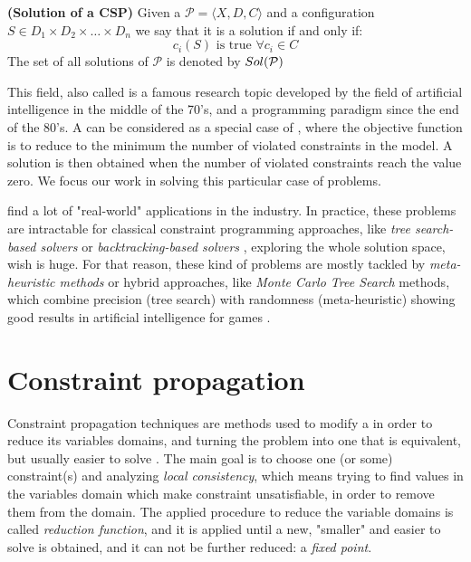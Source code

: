 \begin{definition}{\bf (Solution of a CSP)}
\label{solCSP}
Given a \csp{} $\mathcal{P}=\langle X,D,C \rangle$ and a configuration $S \in D_1\times D_2\times\dots\times D_n$ we say that it is a solution if and only if:	
\begin{equation*}
c_i\left(S\right)\text{ is true }\forall c_i \in C
\end{equation*}
The set of all solutions of $\mathcal{P}$ is denoted by $\mathnormal{Sol}(\mathcal{P})$
\end{definition}

This field, also called \CP{} is a famous research topic developed by the field of artificial intelligence in the middle of the 70's, and a programming paradigm since the end of the 80's. A \csp{} can be considered as a special case of \COPs, where the objective function is to reduce to the minimum the number of violated constraints in the model. A solution is then obtained when the number of violated constraints reach the value zero. We focus our work in solving this particular case of problems.

\csps{} find a lot of "real-world" applications in the industry. In practice, these problems are intractable for classical constraint programming approaches, like \textit{tree search-based solvers} or {\it backtracking-based solvers} \cite{Abio2014}, exploring the whole solution space, wish is huge. For that reason, these kind of problems are mostly tackled by {\it meta-heuristic methods} or hybrid approaches, like \textit{Monte Carlo Tree Search} methods, which combine precision (tree search) with randomness (meta-heuristic) showing good results in artificial intelligence for games \cite{Chaslot2008, Browne2012}.

\section{Constraint propagation}\label{sec:progagation}

Constraint propagation techniques are methods used to modify a \CSP{} in order to reduce its variables domains, and turning the problem into one that is equivalent, but usually easier to solve \cite{ChristianBessiere2006}. The main goal is to choose one (or some) constraint(s) and analyzing \textit{local consistency}, which means trying to find values in the variables domain which make constraint unsatisfiable, in order to remove them from the domain. The applied procedure to reduce the variable domains is called \textit{reduction function}, and it is applied until a new, "smaller" and easier to solve is obtained, and it can not be further reduced: a \textit{fixed point}.


